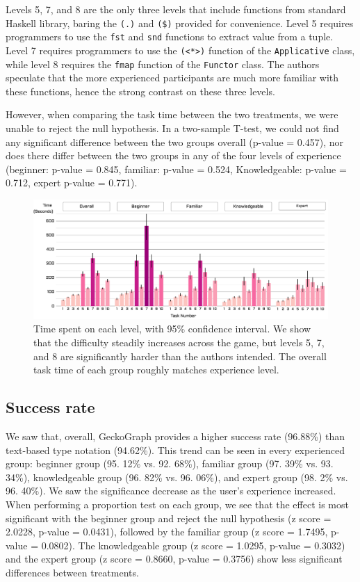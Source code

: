 \documentclass[preprint,12pt]{elsarticle}
\begin{document}
Levels 5, 7, and 8 are the only three levels that include functions from standard Haskell library, baring the \texttt{(.)} and \texttt{(\$)} provided for convenience. Level 5 requires programmers to use the \texttt{fst} and \texttt{snd} functions to extract value from a tuple. Level 7 requires programmers to use the \texttt{(<*>)} function of the \texttt{Applicative} class, while level 8 requires the \texttt{fmap} function of the \texttt{Functor} class. The authors speculate that the more experienced participants are much more familiar with these functions, hence the strong contrast on these three levels. 

However, when comparing the task time between the two treatments, we were unable to reject the null hypothesis. In a two-sample T-test, we could not find any significant difference between the two groups overall (p-value = 0.457), nor does there differ between the two groups in any of the four levels of experience (beginner: p-value = 0.845, familiar: p-value = 0.524, Knowledgeable: p-value = 0.712, expert p-value = 0.771).

\begin{figure}[]
  \includegraphics[width=\linewidth]{figures/LevelTime}
  \caption{\label{fig:level-time} Time spent on each level, with 95\% confidence interval. We show that the difficulty steadily increases across the game, but levels 5, 7, and 8 are significantly harder than the authors intended. The overall task time of each group roughly matches experience level.}
\end{figure}

\subsection{Success rate}
We saw that, overall, GeckoGraph provides a higher success rate (96.88\%) than text-based type notation (94.62\%). This trend can be seen in every experienced group: beginner group (95. 12\% vs. 92. 68\%), familiar group (97. 39\% vs. 93. 34\%), knowledgeable group (96. 82\% vs. 96. 06\%), and expert group (98. 2\% vs. 96. 40\%). We saw the significance decrease as the user's experience increased. When performing a proportion test on each group, we see that the effect is most significant with the beginner group and reject the null hypothesis (z score = 2.0228, p-value = 0.0431), followed by the familiar group (z score = 1.7495, p-value = 0.0802). The knowledgeable group (z score = 1.0295, p-value = 0.3032) and the expert group (z score = 0.8660, p-value = 0.3756) show less significant differences between treatments. 
\end{document}
